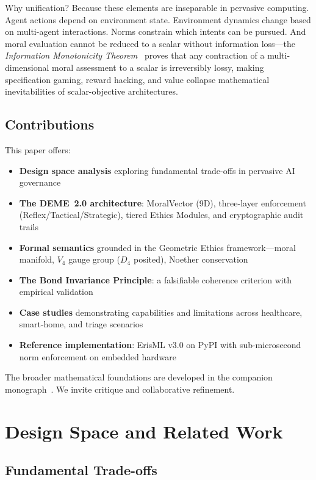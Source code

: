 \documentclass[conference]{IEEEtran}
\begin{document}
Why unification? Because these elements are inseparable in pervasive
computing. Agent actions depend on environment state. Environment
dynamics change based on multi-agent interactions. Norms constrain which
intents can be pursued. And moral evaluation cannot be reduced to a scalar without information loss---the \emph{Information Monotonicity Theorem}~\cite{bond2026ge} proves that any contraction of a multi-dimensional moral assessment to a scalar is irreversibly lossy, making specification gaming, reward hacking, and value collapse mathematical inevitabilities of scalar-objective architectures.

\subsection{Contributions}

This paper offers:
\begin{itemize}
\item \textbf{Design space analysis} exploring fundamental trade-offs in pervasive AI governance
\item \textbf{The DEME~2.0 architecture}: MoralVector (9D), three-layer enforcement (Reflex/Tactical/Strategic), tiered Ethics Modules, and cryptographic audit trails
\item \textbf{Formal semantics} grounded in the Geometric Ethics framework---moral manifold, $V_4$ gauge group ($D_4$ posited), Noether conservation
\item \textbf{The Bond Invariance Principle}: a falsifiable coherence criterion with empirical validation
\item \textbf{Case studies} demonstrating capabilities and limitations across healthcare, smart-home, and triage scenarios
\item \textbf{Reference implementation}: ErisML v3.0 on PyPI with sub-microsecond norm enforcement on embedded hardware
\end{itemize}

The broader mathematical foundations are developed in the companion monograph~\cite{bond2026ge}. We invite critique and collaborative refinement.

\section{Design Space and Related Work}
\label{sec:design-space}

\subsection{Fundamental Trade-offs}
\end{document}
